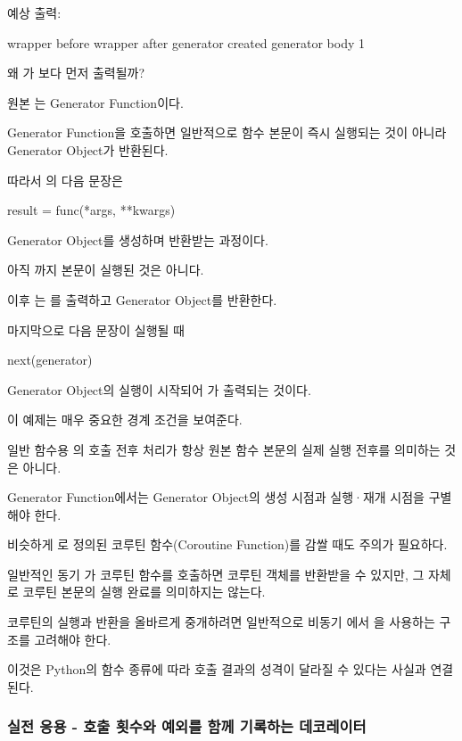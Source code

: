 예상 출력:

\begin{dhkzsh}
wrapper before
wrapper after
generator created
generator body
1
\end{dhkzsh}

왜 가 보다 먼저 출력될까?

원본 는 Generator Function이다.

Generator Function을 호출하면 일반적으로 함수 본문이 즉시 실행되는 것이 아니라 Generator Object가 반환된다.

따라서 의 다음 문장은

\begin{dhkcode}
result = func(*args, **kwargs)
\end{dhkcode}

Generator Object를 생성하며 반환받는 과정이다.

아직 까지 본문이 실행된 것은 아니다.

이후 는 를 출력하고 Generator Object를 반환한다.

마지막으로 다음 문장이 실행될 때

\begin{dhkcode}
next(generator)
\end{dhkcode}

Generator Object의 실행이 시작되어 가 출력되는 것이다.

이 예제는 매우 중요한 경계 조건을 보여준다.

일반 함수용 의 호출 전후 처리가 항상 원본 함수 본문의 실제 실행 전후를 의미하는 것은 아니다.

Generator Function에서는 Generator Object의 생성 시점과 실행·재개 시점을 구별해야 한다.

비슷하게 로 정의된 코루틴 함수(Coroutine Function)를 감쌀 때도 주의가 필요하다.

일반적인 동기 가 코루틴 함수를 호출하면 코루틴 객체를 반환받을 수 있지만, 그 자체로 코루틴 본문의 실행 완료를 의미하지는 않는다.

코루틴의 실행과 반환을 올바르게 중개하려면 일반적으로 비동기 에서 을 사용하는 구조를 고려해야 한다.

이것은 Python의 함수 종류에 따라 호출 결과의 성격이 달라질 수 있다는 사실과 연결된다.

\subsubsection{실전 응용 - 호출 횟수와 예외를 함께 기록하는 데코레이터}


